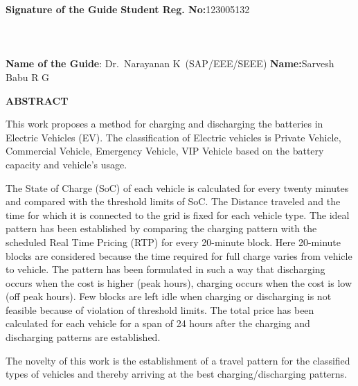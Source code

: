 \documentclass[a4paper, 12pt, oneside]{sastra}
\begin{document}
	\vspace*{24pt}
	
	\noindent \textbf{Signature of the Guide} \hspace*{66mm} \textbf{Student Reg. No:}123005132\\
		\\
	\\
	\\
\noindent \textbf{Name of the Guide}:{ Dr.~Narayanan K}~(SAP/EEE/SEEE) \hspace*{10mm} \textbf{Name:}{Sarvesh Babu R G}
\pagebreak
	
	\begin{center}
		\Large{{\textbf{ABSTRACT}}}
	\end{center}
	
	
	\vspace*{24pt}
	
	\noindent This work proposes a method for charging and discharging the batteries in Electric Vehicles (EV). The classification of Electric vehicles is Private Vehicle, Commercial Vehicle, Emergency Vehicle, VIP Vehicle based on the battery capacity and vehicle's usage.
	
	\noindent The State of Charge (SoC) of each vehicle is calculated for every twenty minutes and compared with the threshold limits of SoC. The Distance traveled and the time for which it is connected to the grid is fixed for each vehicle type. The ideal pattern has been established by comparing the charging pattern with the scheduled Real Time Pricing (RTP) for every 20-minute block. Here 20-minute blocks are considered because the time required for full charge varies from vehicle to vehicle. The pattern has been formulated in such a way that discharging occurs when the cost is higher (peak hours), charging occurs when the cost is low (off peak hours). Few blocks are left idle when charging or discharging is not feasible because of violation of threshold limits. The total price has been calculated for each vehicle for a span of 24 hours after the charging and discharging patterns are established.
	
	\noindent The novelty of this work is the establishment of a travel pattern for the classified types of vehicles and thereby arriving at the best charging/discharging patterns.
	
\end{document}
